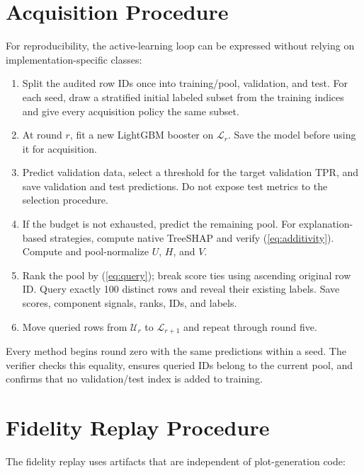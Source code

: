 \section{Acquisition Procedure}
\label{app:acquisition}

For reproducibility, the active-learning loop can be expressed without relying
on implementation-specific classes:

\begin{enumerate}
    \item Split the audited row IDs once into training/pool, validation, and test.
    For each seed, draw a stratified initial labeled subset from the training
    indices and give every acquisition policy the same subset.
    \item At round $r$, fit a new LightGBM booster on $\mathcal{L}_r$. Save the
    model before using it for acquisition.
    \item Predict validation data, select a threshold for the target validation
    TPR, and save validation and test predictions. Do not expose test metrics to
    the selection procedure.
    \item If the budget is not exhausted, predict the remaining pool. For
    explanation-based strategies, compute native TreeSHAP and verify
    (\ref{eq:additivity}). Compute and pool-normalize $U$, $H$, and $V$.
    \item Rank the pool by (\ref{eq:query}); break score ties using ascending
    original row ID. Query exactly 100 distinct rows and reveal their existing
    labels. Save scores, component signals, ranks, IDs, and labels.
    \item Move queried rows from $\mathcal{U}_r$ to $\mathcal{L}_{r+1}$ and
    repeat through round five.
\end{enumerate}

Every method begins round zero with the same predictions within a seed. The
verifier checks this equality, ensures queried IDs belong to the current pool,
and confirms that no validation/test index is added to training.

\section{Fidelity Replay Procedure}
\label{app:fidelity}

The fidelity replay uses artifacts that are independent of plot-generation code:

